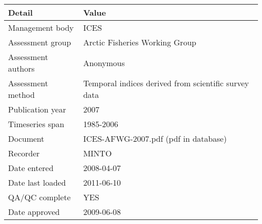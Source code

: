 \begin{table}[htb]
\centering
\begin{tabular}{lp{7cm}}
\toprule
Detail & Value \\
\midrule
Management body    & ICES                                                 \\
Assessment group   & Arctic Fisheries Working Group                       \\
Assessment authors & Anonymous                                            \\
Assessment method  & Temporal indices derived from scientific survey data \\
Publication year   & 2007                                                 \\
Timeseries span    & 1985-2006                                            \\
Document           & ICES-AFWG-2007.pdf (pdf in database)                 \\
Recorder           & MINTO                                                \\
Date entered       & 2008-04-07                                           \\
Date last loaded   & 2011-06-10                                           \\
QA/QC complete     & YES                                                  \\
Date approved      & 2009-06-08                                           \\
\bottomrule
\end{tabular}
\label{tab:assessdet}
\end{table}
